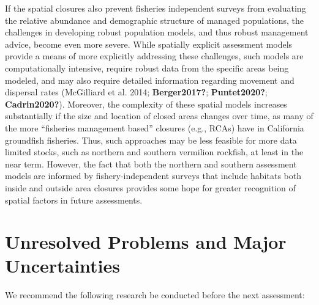 \documentclass[
  english,
  a4paper,
]{article}
\begin{document}
If the spatial closures also prevent fisheries independent surveys from evaluating the relative abundance and demographic structure of managed populations, the challenges in developing robust population models, and thus robust management advice, become even more severe. While spatially explicit assessment models provide a means of more explicitly addressing these challenges, such models are computationally intensive, require robust data from the specific areas being modeled, and may also require detailed information regarding movement and dispersal rates (McGilliard et al. 2014; \textbf{Berger2017?}; \textbf{Puntet2020?}; \textbf{Cadrin2020?}). Moreover, the complexity of these spatial models increases substantially if the size and location of closed areas changes over time, as many of the more ``fisheries management based'' closures (e.g., RCAs) have in California groundfish fisheries. Thus, such approaches may be less feasible for more data limited stocks, such as northern and southern vermilion rockfish, at least in the near term. However, the fact that both the northern and southern assessment models are informed by fishery-independent surveys that include habitats both inside and outside area closures provides some hope for greater recognition of spatial factors in future assessments.

\hypertarget{unresolved-problems-and-major-uncertainties-1}{%
\section{Unresolved Problems and Major Uncertainties}\label{unresolved-problems-and-major-uncertainties-1}}

We recommend the following research be conducted before the next assessment:
\end{document}
